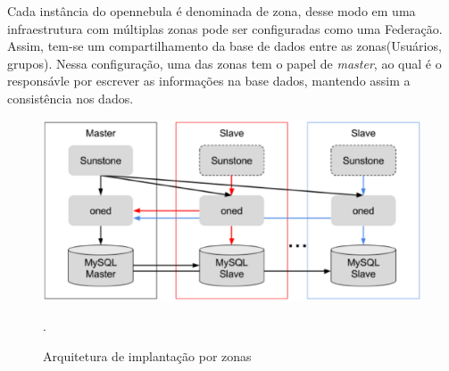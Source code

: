 Cada instância do opennebula é denominada de zona, desse modo em uma infraestrutura com múltiplas zonas pode ser configuradas como uma Federação. Assim, tem-se um compartilhamento da base de dados entre as zonas(Usuários, grupos). Nessa configuração, uma das zonas tem o papel de \textit{master}, ao qual é o responsávle por escrever as informações na base dados, mantendo assim a consistência nos dados\cite{opennebula}.

\begin{figure}[!htb]
\centering
\includegraphics [keepaspectratio=true,scale=0.60]{figuras/opennebula_zone.eps}
\caption{Arquitetura de implantação por zonas}
\cite{opennebula}.
\label{opennebulafederation}
\end{figure}




